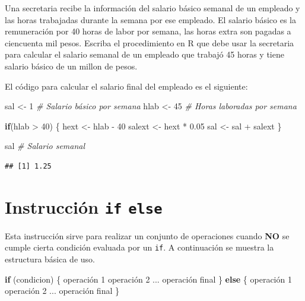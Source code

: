 \documentclass[
]{book}
\makeatletter
\newenvironment{Shaded}{\begin{snugshade}}{\end{snugshade}}
\newcommand{\CommentTok}[1]{\textcolor[rgb]{0.56,0.35,0.01}{\textit{#1}}}
\newcommand{\ControlFlowTok}[1]{\textcolor[rgb]{0.13,0.29,0.53}{\textbf{#1}}}
\newcommand{\DecValTok}[1]{\textcolor[rgb]{0.00,0.00,0.81}{#1}}
\newcommand{\FloatTok}[1]{\textcolor[rgb]{0.00,0.00,0.81}{#1}}
\newcommand{\NormalTok}[1]{#1}
\newcommand{\OtherTok}[1]{\textcolor[rgb]{0.56,0.35,0.01}{#1}}
\newcommand{\SpecialCharTok}[1]{\textcolor[rgb]{0.00,0.00,0.00}{#1}}
\newenvironment{kframe}{%
\medskip{}
\setlength{\fboxsep}{.8em}
 \def\at@end@of@kframe{}%
 \ifinner\ifhmode%
  \def\at@end@of@kframe{\end{minipage}}%
  \begin{minipage}{\columnwidth}%
 \fi\fi%
 \def\FrameCommand##1{\hskip\@totalleftmargin \hskip-\fboxsep
 \colorbox{shadecolor}{##1}\hskip-\fboxsep
     \hskip-\linewidth \hskip-\@totalleftmargin \hskip\columnwidth}%
 \MakeFramed {\advance\hsize-\width
   \@totalleftmargin\z@ \linewidth\hsize
   \@setminipage}}%
 {\par\unskip\endMakeFramed%
 \at@end@of@kframe}
\renewenvironment{Shaded}{\begin{kframe}}{\end{kframe}}
\makeatother
\begin{document}
Una secretaria recibe la información del salario básico semanal de un empleado y las horas trabajadas durante la semana por ese empleado. El salario básico es la remuneración por 40 horas de labor por semana, las horas extra son pagadas a ciencuenta mil pesos. Escriba el procedimiento en R que debe usar la secretaria para calcular el salario semanal de un empleado que trabajó 45 horas y tiene salario básico de un millon de pesos.

El código para calcular el salario final del empleado es el siguiente:

\begin{Shaded}
\begin{Highlighting}[]
\NormalTok{sal }\OtherTok{\textless{}{-}} \DecValTok{1}  \CommentTok{\# Salario básico por semana}
\NormalTok{hlab }\OtherTok{\textless{}{-}} \DecValTok{45}   \CommentTok{\# Horas laboradas por semana}

\ControlFlowTok{if}\NormalTok{(hlab }\SpecialCharTok{\textgreater{}} \DecValTok{40}\NormalTok{) \{}
\NormalTok{  hext }\OtherTok{\textless{}{-}}\NormalTok{ hlab }\SpecialCharTok{{-}} \DecValTok{40}
\NormalTok{  salext }\OtherTok{\textless{}{-}}\NormalTok{ hext }\SpecialCharTok{*} \FloatTok{0.05}
\NormalTok{  sal }\OtherTok{\textless{}{-}}\NormalTok{ sal }\SpecialCharTok{+}\NormalTok{ salext}
\NormalTok{\}}

\NormalTok{sal  }\CommentTok{\# Salario semanal}
\end{Highlighting}
\end{Shaded}

\begin{verbatim}
## [1] 1.25
\end{verbatim}

\hypertarget{instrucciuxf3n-if-else}{%
\section{\texorpdfstring{Instrucción \texttt{if} \texttt{else}}{Instrucción if else}}\label{instrucciuxf3n-if-else}}

Esta instrucción sirve para realizar un conjunto de operaciones cuando \textbf{NO} se cumple cierta condición evaluada por un \texttt{if}. A continuación se muestra la estructura básica de uso.

\begin{Shaded}
\begin{Highlighting}[]
\ControlFlowTok{if}\NormalTok{ (condicion) \{}
\NormalTok{  operación }\DecValTok{1}
\NormalTok{  operación }\DecValTok{2}
\NormalTok{  ...}
\NormalTok{  operación final}
\NormalTok{\}}
\ControlFlowTok{else}\NormalTok{ \{}
\NormalTok{  operación }\DecValTok{1}
\NormalTok{  operación }\DecValTok{2}
\NormalTok{  ...}
\NormalTok{  operación final}
\NormalTok{\}}
\end{Highlighting}
\end{Shaded}
\end{document}
